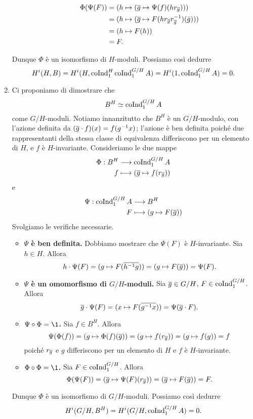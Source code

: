 \documentclass[a4paper]{article}
\begin{document}
\begin{enumerate}[(1)]
\begin{itemize}
\begin{align*}
\Phi(\Psi(F))&=(h\mapsto(\overline{g}\mapsto\Psi(f)(hr_{\overline{g}})))\\
&=(h\mapsto(\overline{g}\mapsto F(hr_{\overline{g}}r_{\overline{g}}^{-1})(\bar{g})))\\
&=(h\mapsto F(h))\\
&=F.
\end{align*}
\end{itemize}
Dunque $\Phi$ è un isomorfismo di $H$-moduli. Possiamo così dedurre
$$
H^i(H,B)=H^i(H,\operatorname{coInd}_1^H\operatorname{coInd}_1^{G/H}A)=H^i(1,\operatorname{coInd}_1^{G/H}A)=0.
$$
\item Ci proponiamo di dimostrare che
$$
B^H\simeq\operatorname{coInd}_1^{G/H}A
$$
come $G/H$-moduli. Notiamo innanzitutto che $B^H$ è un $G/H$-modulo, con l'azione definita da $(\overline{g}\cdot f)(x)=f(g^{-1}x)$; l'azione è ben definita poiché due rappresentanti della stessa classe di equivalenza differiscono per un elemento di $H$, e $f$ è $H$-invariante. Consideriamo le due mappe
\begin{align*}
\Phi:B^H&\longrightarrow\operatorname{coInd}_1^{G/H}A\\
f&\longmapsto(\overline{g}\mapsto f(r_{\overline{g}}))
\end{align*}
e
\begin{align*}
\Psi:\operatorname{coInd}_1^{G/H}A&\longrightarrow B^H\\
F&\longmapsto(g\mapsto F(\overline{g}))
\end{align*}
Svolgiamo le verifiche necessarie.
\begin{itemize}
\item \textbf{$\Psi$ è ben definita.} Dobbiamo mostrare che $\Psi(F)$ è $H$-invariante. Sia $h\in H$. Allora
$$
h\cdot\Psi(F)=(g\mapsto F(\overline{h^{-1}g}))=(g\mapsto F(\overline{g}))=\Psi(F).
$$
\item \textbf{$\Psi$ è un omomorfismo di $G/H$-moduli.} Sia $\overline{g}\in G/H$, $F\in\operatorname{coInd}_1^{G/H}$. Allora
$$
\overline{g}\cdot\Psi(F)=(x\mapsto F(\overline{g^{-1}x}))=\Psi(\overline{g}\cdot F).
$$
\item \textbf{$\Psi\circ\Phi=\1$.} Sia $f\in B^H$. Allora
$$
\Psi(\Phi(f))=(g\mapsto\Phi(f)(\overline{g}))=(g\mapsto f(r_{\overline{g}}))=(g\mapsto f(g))=f
$$
poiché $r_{\overline{g}}$ e $g$ differiscono per un elemento di $H$ e $f$ è $H$-invariante.
\item \textbf{$\Phi\circ\Phi=\1$.} Sia $F\in\operatorname{coInd}_1^{G/H}$. Allora
$$
\Phi(\Psi(F))=(\overline{g}\mapsto\Psi(F)(r_{\overline{g}}))=(\overline{g}\mapsto F(\overline{g}))=F.
$$
\end{itemize}
Dunque $\Phi$ è un isomorfismo di $G/H$-moduli. Possiamo così dedurre
$$
H^i(G/H,B^H)=H^i(G/H,\operatorname{coInd}_1^{G/H}A)=0.
$$
\end{enumerate}
\end{document}
